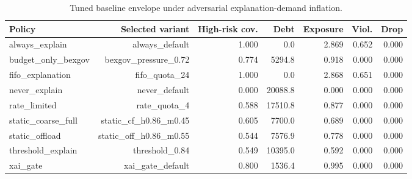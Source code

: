 \begin{table}[t]
\caption{Tuned baseline envelope under adversarial explanation-demand inflation.}
\label{tab:tuned_baseline_envelope_adversarial}
\centering
\scriptsize
\begin{tabular}{@{}lrrrrrr@{}}
\toprule
Policy & Selected variant & High-risk cov. & Debt & Exposure & Viol. & Drop \\
\midrule
always\_explain & always\_default & 1.000 & 0.0 & 2.869 & 0.652 & 0.000 \\
budget\_only\_bexgov & bexgov\_pressure\_0.72 & 0.774 & 5294.8 & 0.918 & 0.000 & 0.000 \\
fifo\_explanation & fifo\_quota\_24 & 1.000 & 0.0 & 2.868 & 0.651 & 0.000 \\
never\_explain & never\_default & 0.000 & 20088.8 & 0.000 & 0.000 & 0.000 \\
rate\_limited & rate\_quota\_4 & 0.588 & 17510.8 & 0.877 & 0.000 & 0.000 \\
static\_coarse\_full & static\_cf\_h0.86\_m0.45 & 0.605 & 7700.0 & 0.689 & 0.000 & 0.000 \\
static\_offload & static\_off\_h0.86\_m0.55 & 0.544 & 7576.9 & 0.778 & 0.000 & 0.000 \\
threshold\_explain & threshold\_0.84 & 0.549 & 10395.0 & 0.592 & 0.000 & 0.000 \\
xai\_gate & xai\_gate\_default & 0.800 & 1536.4 & 0.995 & 0.000 & 0.000 \\
\bottomrule
\end{tabular}
\end{table}
